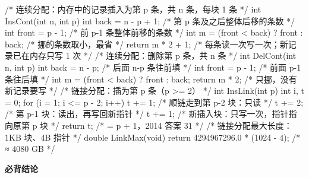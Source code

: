 \documentclass[10pt,a4paper]{ctexart}
\begin{document}
\begin{codebox}
/* 连续分配：内存中的记录插入为第 p 条，共 n 条，每块 1 条 */
int InsCont(int n, int p) {
    int back  = n - p + 1;        /* 第 p 条及之后整体后移的条数 */
    int front = p - 1;            /* 前 p-1 条整体前移的条数 */
    int m = (front < back) ? front : back;   /* 挪的条数取小，最省 */
    return m * 2 + 1;             /* 每条读一次写一次；新记录已在内存只写 1 次 */
}
/* 连续分配：删除第 p 条，共 n 条 */
int DelCont(int n, int p) {
    int back  = n - p;            /* 后面 n-p 条往前填 */
    int front = p - 1;            /* 前面 p-1 条往后填 */
    int m = (front < back) ? front : back;
    return m * 2;                 /* 只挪，没有新记录要写 */
}
/* 链接分配：插为第 p 条（p >= 2） */
int InsLink(int p) {
    int i, t = 0;
    for (i = 1; i <= p - 2; i++) t += 1;  /* 顺链走到第 p-2 块：只读 */
    t += 2;                               /* 第 p-1 块：读出，再写回新指针 */
    t += 1;                               /* 新插入块：只写一次，指针指向原第 p 块 */
    return t;                             /* = p + 1，2014 答案 31 */
}
/* 链接分配最大长度：1KB 块、4B 指针 */
double LinkMax(void) { return 4294967296.0 * (1024 - 4); }  /* ≈ 4080 GB */
\end{codebox}




\textbf{必背结论}
\end{document}
